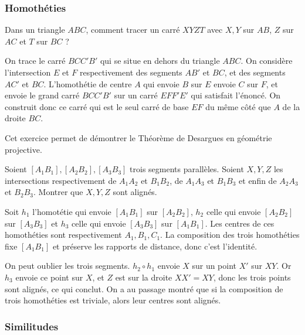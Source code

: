 \subsubsection{Homothéties}

\begin{exo}
Dans un triangle $ABC$, comment tracer un carré $XYZT$ avec $X,Y$ sur $AB$, $Z$ sur $AC$ et $T$ sur $BC$ ?
\end{exo}

\begin{sol}
On trace le carré $BCC'B'$ qui se situe en dehors du triangle $ABC$. On considère l'intersection $E$ et $F$ respectivement des segments $AB'$ et $BC$, et des segments $AC'$ et $BC$. L'homothétie de centre $A$ qui envoie $B$ sur $E$ envoie $C$ sur $F$, et envoie le grand carré $BCC'B'$ sur un carré $EFF'E'$ qui satisfait l'énoncé. On construit donc ce carré qui est le seul carré de base $EF$ du même côté que $A$ de la droite $BC$.
\end{sol}

Cet exercice permet de démontrer le Théorème de Desargues en géométrie projective.

\begin{exo}
Soient $[A_1B_1],[A_2B_2],[A_3B_3]$ trois segments parallèles. Soient $X,Y,Z$ les intersections respectivement de $A_1A_2$ et $B_1B_2$, de $A_1A_3$ et $B_1B_3$ et enfin de $A_2A_3$ et $B_2B_3$. Montrer que $X,Y,Z$ sont alignés.
\end{exo}

\begin{sol}
Soit $h_1$ l'homotétie qui envoie $[A_1B_1]$ sur $[A_2B_2]$, $h_2$ celle qui envoie $[A_2B_2]$ sur $[A_3B_3]$ et $h_3$ celle qui envoie $[A_3B_3]$ sur $[A_1B_1]$. Les centres de ces homothéties sont respectivement $A_1,B_1,C_1$. La composition des trois homothéties fixe $[A_1B_1]$ et préserve les rapports de distance, donc c'est l'identité.

\medskip

On peut oublier les trois segments. $h_2\circ h_1$ envoie $X$ sur un point $X'$ sur $XY$. Or $h_3$ envoie ce point sur $X$, et $Z$ est sur la droite $XX'=XY$, donc les trois points sont alignés, ce qui conclut. On a au passage montré que si la composition de trois homothéties est triviale, alors leur centres sont alignés.
\end{sol}

\subsubsection{Similitudes}

